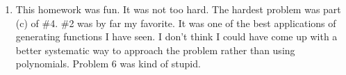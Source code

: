 \documentclass[12pt]{article}
\begin{document}
\begin{enumerate}[leftmargin=0cm,itemindent=.5cm,labelwidth=\itemindent,labelsep=0cm,align=left]
\item This homework was fun.  It was not too hard.  The hardest problem was part (c) of \#4.  \#2 was by far my favorite.  It was one of the best applications of generating functions I have seen.  I don't think I could have come up with a better systematic way to approach the problem rather than using polynomials.  Problem 6 was kind of stupid.

\end{enumerate}
\end{document}
